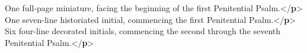 \begin{shaded}
\mbox{}\newline 
\hspace*{1em}One full-page miniature, facing the beginning of the first Penitential\mbox{}\newline 
\hspace*{1em}\hspace*{1em}\hspace*{1em}\hspace*{1em} Psalm.{</\textbf{p}>}\mbox{}\newline 
{}\mbox{}\newline 
{}\mbox{}\newline 
\hspace*{1em}One seven-line historiated initial, commencing the first Penitential\mbox{}\newline 
\hspace*{1em}\hspace*{1em}\hspace*{1em}\hspace*{1em} Psalm.{</\textbf{p}>}\mbox{}\newline 
{}\mbox{}\newline 
{}\mbox{}\newline 
\hspace*{1em}Six four-line decorated initials, commencing the second through the seventh\mbox{}\newline 
\hspace*{1em}\hspace*{1em}\hspace*{1em}\hspace*{1em} Penitential Psalm.{</\textbf{p}>}\mbox{}\newline 
{}\mbox{}\newline 

\end{shaded}
